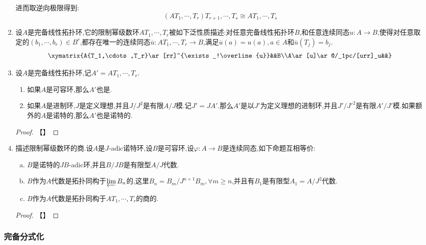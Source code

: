 \begin{enumerate}
    进而取逆向极限得到:
    $$\left(A{T_1,\cdots,T_r}\right){T_{r+1},\cdots,T_s}\cong A{T_1,\cdots,T_s}$$
    \item 设$A$是完备线性拓扑环,它的限制幂级数环$A{T_1,\cdots,T_r}$被如下泛性质描述:对任意完备线性拓扑环$B$,和任意连续同态$u:A\to B$,使得对任意取定的$(b_1,\cdots,b_r)\in B^r$,都存在唯一的连续同态$\overline{u}:A{T_1,\cdots,T_r}\to B$,满足$\overline{u}(a)=u(a),a\in A$和$\overline{u}(T_j)=b_j$.
    $$\xymatrix{A{T_1,\cdots,T_r}\ar[rr]^{\exists_!\overline{u}}&&B\\A\ar[u]\ar@/_1pc/[urr]_u&&}$$
    \item 设$A$是完备线性拓扑环,记$A'=A{T_1,\cdots,T_r}$.
    \begin{enumerate}[(1)]
    	\item 如果$A$是可容环,那么$A'$也是.
    	\item 如果$A$是进制环,$J$是定义理想,并且$J/J^2$是有限$A/J$模.记$J'=JA'$.那么$A'$是以$J'$为定义理想的进制环,并且$J'/{J'}^2$是有限$A'/J'$模.如果额外的$A$是诺特的,那么$A'$也是诺特的.
    \end{enumerate}
    \begin{proof}
    	
    	【】
    \end{proof}
    \item 描述限制幂级数环的商.设$A$是$J$-adic诺特环,设$B$是可容环,设$\varphi:A\to B$是连续同态,如下命题互相等价:
    \begin{enumerate}[(a)]
    	\item $B$是诺特的$JB$-adic环,并且$B/JB$是有限型$A/J$代数.
    	\item $B$作为$A$代数是拓扑同构于$\varprojlim B_n$的,这里$B_n=B_m/J^{n+1}B_m,\forall m\ge n$,并且有$B_1$是有限型$A_1=A/J^2$代数.
    	\item $B$作为$A$代数是拓扑同构于$A{T_1,\cdots,T_r}$的商的.
    \end{enumerate}
    \begin{proof}
    	
    	【】
    \end{proof}
\end{enumerate}



\subsubsection{完备分式化}


